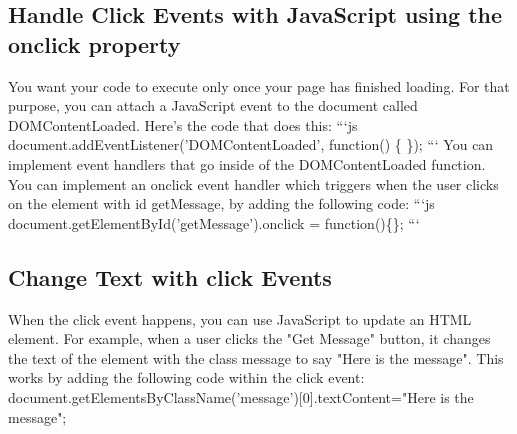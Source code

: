 \documentclass{article}%
\begin{document}
\subsection{Handle Click Events with JavaScript using the onclick property}%
\label{subsec:HandleClickEventswithJavaScriptusingtheonclickproperty}%
You want your code to execute only once your page has finished loading. For that purpose, you can attach a JavaScript event to the document called DOMContentLoaded. Here's the code that does this:\newline%
```js\newline%
document.addEventListener('DOMContentLoaded', function() \{\newline%
\});\newline%
```\newline%
You can implement event handlers that go inside of the DOMContentLoaded function. You can implement an onclick event handler which triggers when the user clicks on the element with id getMessage, by adding the following code:\newline%
```js\newline%
document.getElementById('getMessage').onclick = function()\{\};\newline%
```\newline%

%
\subsection{Change Text with click Events}%
\label{subsec:ChangeTextwithclickEvents}%
When the click event happens, you can use JavaScript to update an HTML element.\newline%
For example, when a user clicks the "Get Message" button, it changes the text of the element with the class message to say "Here is the message".\newline%
This works by adding the following code within the click event:\newline%
document.getElementsByClassName('message'){[}0{]}.textContent="Here is the message";\newline%

%
\end{document}

